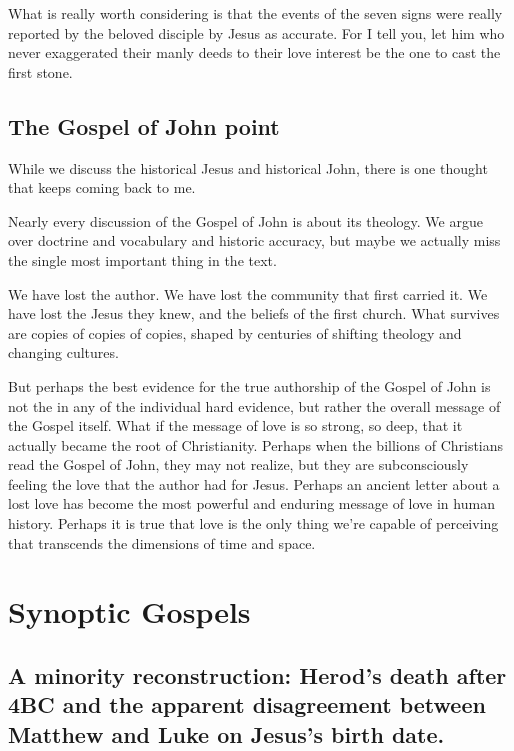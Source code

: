 What is really worth considering is that the events of the seven signs were really reported by the beloved disciple by Jesus as accurate.
For I tell you, let him who never exaggerated their manly deeds to their love interest be the one to cast the first stone.

\subsection{The Gospel of John point}\label{subsec:the-gospel-of-john-point}

While we discuss the historical Jesus and historical John, there is one thought that keeps coming back to me.

Nearly every discussion of the Gospel of John is about its theology.
We argue over doctrine and vocabulary and historic accuracy, but maybe we actually miss the single most important thing in the text.

We have lost the author.
We have lost the community that first carried it.
We have lost the Jesus they knew, and the beliefs of the first church.
What survives are copies of copies of copies, shaped by centuries of shifting theology and changing cultures.

But perhaps the best evidence for the true authorship of the Gospel of John is not the in any of the individual hard evidence, but rather the overall message of the Gospel itself.
What if the message of love is so strong, so deep, that it actually became the root of Christianity.
Perhaps when the billions of Christians read the Gospel of John, they may not realize, but they are subconsciously feeling the love that the author had for Jesus.
Perhaps an ancient letter about a lost love has become the most powerful and enduring message of love in human history.
Perhaps it is true that love is the only thing we're capable of perceiving that transcends the dimensions of time and space.

\section{Synoptic Gospels}\label{sec:synoptic-gospels}

\subsection{A minority reconstruction: Herod's death after 4BC and the apparent disagreement between Matthew and Luke on Jesus's birth date.}\label{subsec:herod-dies-in-10ad-not-4bc-and-the-gospels-of-matthew-and-luke-are-not-in-agreement-on-the-date-of-jesuss-birth.}

